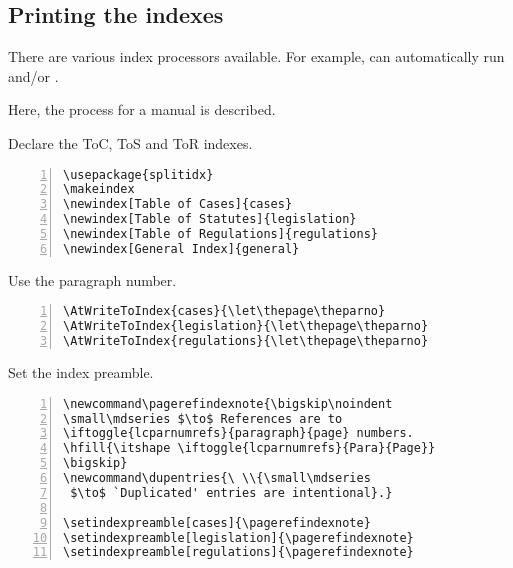 \subsection{Printing the indexes}
\p There are various index processors available. For example,  can automatically run  and/or .

\p Here, the process for a manual  is described.

\p Declare the ToC, ToS and ToR indexes.
             
\bigskip
\begin{mdframed}[backgroundcolor=green!40!yellow!12]
\begin{Verbatim}[numbers=left,numbersep=2pt]
\usepackage{splitidx}
\makeindex
\newindex[Table of Cases]{cases}
\newindex[Table of Statutes]{legislation}
\newindex[Table of Regulations]{regulations}
\newindex[General Index]{general}
\end{Verbatim}

\end{mdframed}


\p {}Use the paragraph number.
             
\bigskip
\begin{mdframed}[backgroundcolor=green!40!yellow!12]
\begin{Verbatim}[numbers=left,numbersep=2pt]
\AtWriteToIndex{cases}{\let\thepage\theparno}
\AtWriteToIndex{legislation}{\let\thepage\theparno}
\AtWriteToIndex{regulations}{\let\thepage\theparno}
\end{Verbatim}

\end{mdframed}

\p Set the index preamble.
             
\bigskip
\begin{mdframed}[backgroundcolor=green!40!yellow!12]
\begin{Verbatim}[numbers=left,numbersep=2pt]
\newcommand\pagerefindexnote{\bigskip\noindent
\small\mdseries $\to$ References are to 
\iftoggle{lcparnumrefs}{paragraph}{page} numbers.
\hfill{\itshape \iftoggle{lcparnumrefs}{Para}{Page}}
\bigskip}
\newcommand\dupentries{\ \\{\small\mdseries
 $\to$ `Duplicated' entries are intentional}.}

\setindexpreamble[cases]{\pagerefindexnote}
\setindexpreamble[legislation]{\pagerefindexnote}
\setindexpreamble[regulations]{\pagerefindexnote}
\end{Verbatim}

\end{mdframed}

